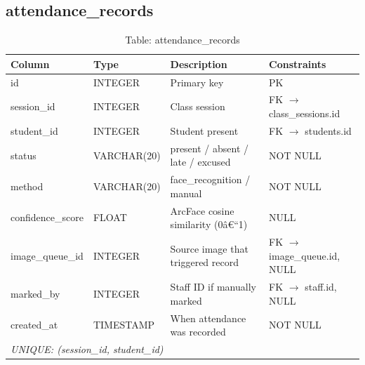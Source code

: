 \documentclass[12pt,a4paper]{report}
\begin{document}
\subsection{attendance\_records}
\begin{table}[H]
\centering\small
\caption{Table: attendance\_records}
\begin{tabularx}{\linewidth}{llXl}
\toprule
\textbf{Column} & \textbf{Type} & \textbf{Description} & \textbf{Constraints} \\
\midrule
id               & INTEGER      & Primary key                        & PK \\
session\_id      & INTEGER      & Class session                      & FK $\to$ class\_sessions.id \\
student\_id      & INTEGER      & Student present                    & FK $\to$ students.id \\
status           & VARCHAR(20)  & present / absent / late / excused  & NOT NULL \\
method           & VARCHAR(20)  & face\_recognition / manual         & NOT NULL \\
confidence\_score& FLOAT        & ArcFace cosine similarity (0â€“1)    & NULL \\
image\_queue\_id & INTEGER      & Source image that triggered record & FK $\to$ image\_queue.id, NULL \\
marked\_by       & INTEGER      & Staff ID if manually marked        & FK $\to$ staff.id, NULL \\
created\_at      & TIMESTAMP    & When attendance was recorded       & NOT NULL \\
\midrule
\multicolumn{4}{l}{\textit{UNIQUE: (session\_id, student\_id)}} \\
\bottomrule
\end{tabularx}
\end{table}
\end{document}
